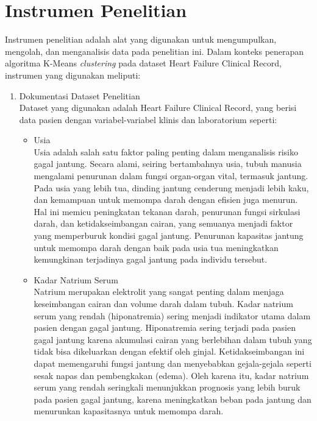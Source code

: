 \documentclass[english,12pt,a4paper,openany]{book}
\begin{document}
	\section{Instrumen Penelitian}
	Instrumen penelitian adalah alat yang digunakan untuk mengumpulkan, mengolah, dan menganalisis data pada penelitian ini. Dalam konteks penerapan algoritma K-Means \textit{clustering} pada dataset Heart Failure Clinical Record, instrumen yang digunakan meliputi:
	\begin{enumerate}
		\item Dokumentasi Dataset Penelitian\\
		Dataset yang digunakan adalah Heart Failure Clinical Record, yang berisi data pasien dengan variabel-variabel klinis dan laboratorium seperti:
		\begin{itemize}
			\item Usia \\
			Usia adalah salah satu faktor paling penting dalam menganalisis risiko gagal jantung. Secara alami, seiring bertambahnya usia, tubuh manusia mengalami penurunan dalam fungsi organ-organ vital, termasuk jantung. Pada usia yang lebih tua, dinding jantung cenderung menjadi lebih kaku, dan kemampuan untuk memompa darah dengan efisien juga menurun. Hal ini memicu peningkatan tekanan darah, penurunan fungsi sirkulasi darah, dan ketidakseimbangan cairan, yang semuanya menjadi faktor yang memperburuk kondisi gagal jantung. Penurunan kapasitas jantung untuk memompa darah dengan baik pada usia tua meningkatkan kemungkinan terjadinya gagal jantung pada individu tersebut.
			
			
			\item Kadar Natrium Serum \\
			Natrium merupakan elektrolit yang sangat penting dalam menjaga keseimbangan cairan dan volume darah dalam tubuh. Kadar natrium serum yang rendah (hiponatremia) sering menjadi indikator utama dalam pasien dengan gagal jantung. Hiponatremia sering terjadi pada pasien gagal jantung karena akumulasi cairan yang berlebihan dalam tubuh yang tidak bisa dikeluarkan dengan efektif oleh ginjal. Ketidakseimbangan ini dapat memengaruhi fungsi jantung dan menyebabkan gejala-gejala seperti sesak napas dan pembengkakan (edema). Oleh karena itu, kadar natrium serum yang rendah seringkali menunjukkan prognosis yang lebih buruk pada pasien gagal jantung, karena meningkatkan beban pada jantung dan menurunkan kapasitasnya untuk memompa darah.
			

\end{itemize}
\end{enumerate}
\end{document}
